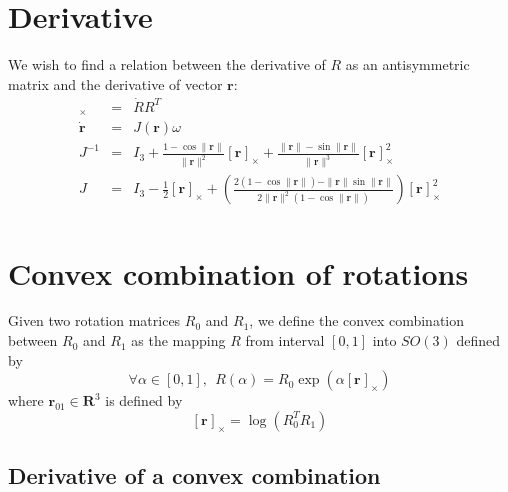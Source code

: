 \documentclass {article}
\newcommand\reals{\mathbf{R}}
\newcommand\rot{\mathbf{r}}
\newcommand\rcross[1]{[\rot_{#1}]_{\times}}
\newcommand\omegacross{[\omega]_{\times}}
\newcommand\normr{\|\rot\|}
\begin{document}
\section {Derivative}
We wish to find a relation between the derivative of $R$ as an antisymmetric
matrix and the derivative of vector $\rot$:
\begin{eqnarray}
\omegacross &=& \dot{R}R^T \\
\label{eq:jacobian}
\dot{\rot} &=& J(\rot)\omega \\
J^{-1} &=& I_3  + \frac{1 - \cos \normr}{\normr^2}\rcross{} + \frac{\normr -\sin\normr}{\normr^3}\rcross{}^2\\
J &=& I_3 -\frac{1}{2}\rcross{} +  \left(\frac{2(1-\cos\normr) - \normr\sin\normr}{2\normr^2(1-\cos\normr)}\right)\rcross{}^2\\
\end{eqnarray}

\section {Convex combination of rotations}

Given two rotation matrices $R_0$ and $R_1$, we define the convex
combination between $R_0$ and $R_1$ as the mapping $R$ from interval
$[0,1]$ into $SO(3)$ defined by
\begin{equation}\label{eq:R_alpha}
\forall \alpha\in[0,1], \ \ R (\alpha) = R_0 \exp\left(\alpha \rcross{} \right)
\end{equation}
where $\rot_{01}\in\reals^3$ is defined by
$$
\rcross{} = \log\left(R_0^T R_1\right)
$$

\subsection {Derivative of a convex combination}
\end{document}
